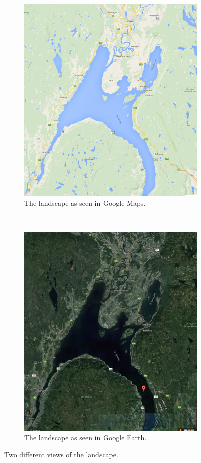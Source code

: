 \documentclass[10pt,a4paper]{article}
\begin{document}
\begin{figure}[h!]
    \centering
    \begin{subfigure}[h]{0.65\textwidth}
        \centering
        \includegraphics[height=1\textwidth]{map_area.png}
        \caption{The landscape as seen in Google Maps.}
    \end{subfigure}%
    ~ 
    \begin{subfigure}[h]{0.65\textwidth}
        \centering
        \includegraphics[height=1\textwidth]{earth_map.png}
        \caption{The landscape as seen in Google Earth.}
    \end{subfigure}
    \caption{Two different views of the landscape.}
\end{figure}
\end{document}
